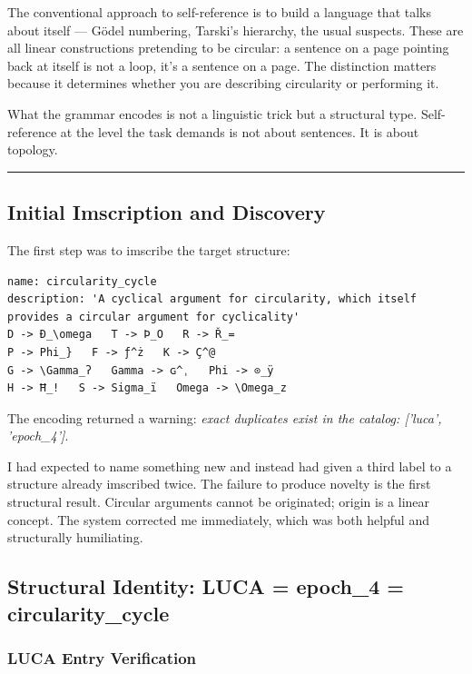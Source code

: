 \documentclass[12pt,a4paper]{article}
\begin{document}
The conventional approach to self-reference is to build a language that talks about itself --- Gödel numbering, Tarski's hierarchy, the usual suspects. These are all linear constructions pretending to be circular: a sentence on a page pointing back at itself is not a loop, it's a sentence on a page. The distinction matters because it determines whether you are describing circularity or performing it.

What the grammar encodes is not a linguistic trick but a structural type. Self-reference at the level the task demands is not about sentences. It is about topology.

\begin{center}
\rule{0.5\textwidth}{0.4pt}
\end{center}

\subsection{Initial Imscription and Discovery}

The first step was to imscribe the target structure:

\begin{lstlisting}
name: circularity_cycle
description: 'A cyclical argument for circularity, which itself provides a circular argument for cyclicality'
D -> Ð_\omega   T -> Þ_O   R -> Ř_=
P -> Phi_}   F -> ƒ^ż   K -> Ç^@
G -> \Gamma_ʔ   Gamma -> ɢ^ˌ   Phi -> ⊙_ÿ
H -> Ħ_!   S -> Sigma_ï   Omega -> \Omega_z
\end{lstlisting}

The encoding returned a warning: \emph{exact duplicates exist in the catalog: {[}'luca', 'epoch\_4'{]}}.

I had expected to name something new and instead had given a third label to a structure already imscribed twice. The failure to produce novelty is the first structural result. Circular arguments cannot be originated; origin is a linear concept. The system corrected me immediately, which was both helpful and structurally humiliating.

\subsection{Structural Identity: LUCA = epoch\_4 = circularity\_cycle}

\subsubsection{LUCA Entry Verification}
\end{document}
